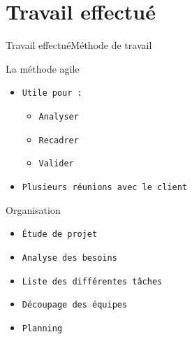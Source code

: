 \documentclass[10pt]{beamer}
\begin{document}
\section{Travail effectué}
\begin{frame}{Travail effectué}{Méthode de travail}
	\begin{block}{La méthode agile}
	  	\begin{itemize}
	  		\item {\tt Utile pour : }
			  	\begin{itemize}
	  				\item {\tt Analyser}
    					\item {\tt Recadrer}
    					\item {\tt Valider}
				\end{itemize}    		
    			\item {\tt Plusieurs réunions avec le client}
		\end{itemize}
	\end{block}
	
	\begin{block}{Organisation}
		\begin{itemize}
	  		\item {\tt Étude de projet}   		
    			\item {\tt Analyse des besoins}
    			\item {\tt Liste des différentes tâches}
    			\item {\tt Découpage des équipes}
    			\item {\tt Planning}
		\end{itemize}
	\end{block}
\end{frame}
\end{document}
